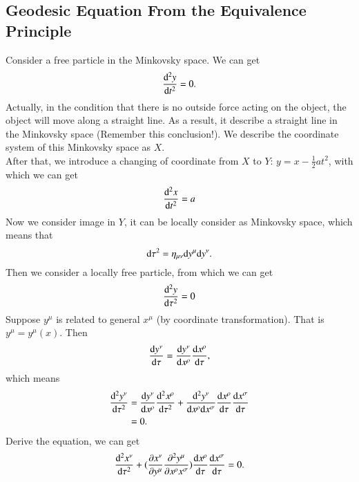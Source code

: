 \documentclass[openany,10pt]{book}
\theoremstyle{definition}
\theoremstyle{definition}
\theoremstyle{remark}
\begin{document}
\subsection{Geodesic Equation From the Equivalence Principle}
Consider a free particle in the Minkovsky space. We can get
\begin{equation}
    \frac{{\rm{d}}^2y}{{\rm{d}}t^2}=0.
\end{equation}
Actually, in the condition that there is no outside force acting on the object, the object will move along a straight line. As a result, it describe a straight line in the Minkovsky space (Remember this conclusion!). We describe the coordinate system of this Minkovsky space as $X$.\\
After that, we introduce a changing of coordinate from $X$ to $Y$: $y=x-\frac{1}{2}at^2$, with which we can get 
\begin{equation}
    \frac{{\rm{d}}^2x}{{\rm{d}}t^2}=a
\end{equation}
Now we consider image in $Y$, it can be locally consider as Minkovsky space, which means that 
\begin{equation}
    {\rm{d}}\tau^2=\eta_{\mu\nu}{\rm{d}}y^\mu{\rm{d}}y^\nu.
\end{equation}
Then we consider a locally free particle, from which we can get 
\begin{equation}
    \frac{{\rm{d}}^2y}{{\rm{d}}\tau^2}=0
\end{equation}
Suppose $y^\mu$ is related to general $x^\mu$ (by coordinate transformation). That is $y^\mu=y^\mu(x)$. Then 
\begin{equation}
\frac{{\rm{d}}y^\nu}{{\rm{d}}\tau}=\frac{{\rm{d}}y^\nu}{{\rm{d}}x^\rho}\frac{{\rm{d}}x^\rho}{{\rm{d}}\tau},
\end{equation}
which means 
\begin{equation}
    \begin{aligned}
    \frac{{\rm{d}}^2y^\nu}{{\rm{d}}\tau^2}&=\frac{{\rm{d}}y^\nu}{{\rm{d}}x^\rho}\frac{{\rm{d}}^2x^\rho}{{\rm{d}}\tau^2}+\frac{{\rm{d}}^2y^\nu}{{\rm{d}}x^\rho{\rm{d}}x^\sigma}\frac{{\rm{d}}x^\rho}{{\rm{d}}\tau}\frac{{\rm{d}}x^\sigma}{{\rm{d}}\tau}\\
    &=0.
    \end{aligned}
\end{equation}
Derive the equation, we can get 
\begin{equation}
    \frac{{\rm{d}}^2x^\nu}{{\rm{d}}\tau^2}+(\frac{\partial x^\nu}{\partial y^\mu}\frac{\partial^2y^\mu}{\partial x^\rho x^\sigma})\frac{{\rm{d}}x^\rho}{{\rm{d}}\tau}\frac{{\rm{d}}x^\sigma}{{\rm{d}}\tau}=0.
\end{equation}
\end{document}
